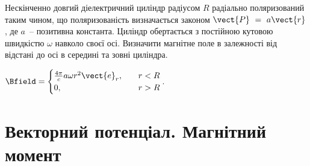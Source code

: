 \begin{problem}%
Нескінченно довгий діелектричний циліндр радіусом $R$ радіально поляризований таким чином, що поляризованість визначається законом $\vect{P}~=~a \vect{r}$, де $a$~-- позитивна константа. Циліндр обертається з постійною кутовою швидкістю $\omega$ навколо своєї осі. Визначити магнітне поле в залежності від відстані до осі в середині та зовні циліндра.
\begin{solution}
	$\Bfield = %
		\begin{cases}
			\frac{4\pi}{c} a \omega r^2 \vect{e}_r, & \quad r < R \\
			0,                                      & \quad r > R
		\end{cases}
	$.
\end{solution}
\end{problem}

\section{Векторний потенціал. Магнітний момент}

